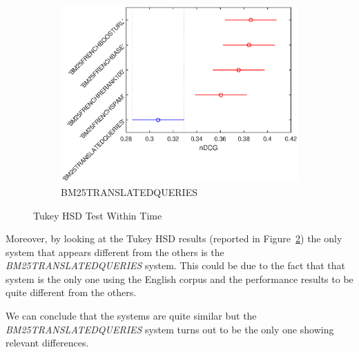 \begin{figure}[p]
\begin{subfigure}[b]{0.49\textwidth}
         \centering
         \includegraphics[width=\textwidth]{figure/heldout/tukeyhsd-5.eps}
         \caption{BM25TRANSLATEDQUERIES}
         \label{fig:wthsd5}
     \end{subfigure}
        \caption{Tukey HSD Test Within Time}
        \label{fig:wthsd}
\end{figure}
\par
Moreover, by looking at the Tukey HSD results (reported in Figure~\ref{fig:wthsd}) the only system that appears different from the others is the \textit{BM25TRANSLATEDQUERIES} system. This could be due to the fact that that system is the only one using the English corpus and the performance results to be quite different from the others.
\par
We can conclude that the systems are quite similar but the \textit{BM25TRANSLATEDQUERIES} system turns out to be the only one showing relevant differences.


